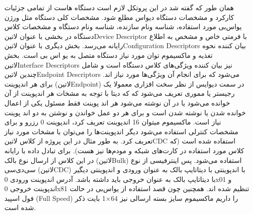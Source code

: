 همان طور که گفته شد در این پروتکل لازم است دستگاه هاست از تمامی جزئیات کارکرد و مشخصات دستگاه دیواس مطلع شود. مشخصات کلی دستگاه مثل ورژن یو‌اس‌بی مورد استفاده، شناسه ونام سازنده، شناسه ونام دستگاه و مشخصات کلاس دستگاه در بخشی با عنوان ‌لاتین{Device Descriptor} با فرمتی خاص و مشخص به اطلاع رایانه می‌رسد. بخش دیگری با عنوان ‌لاتین{Configuration Descriptors} بیان کننده نحوه تغذیه و ماکسیموم توان مورد نیاز دستگاه متصل به یو اس بی است. بخش ‌لاتین{Interface Descriptors} نیز بیان کننده ویژگی‌های کلاس دستگاه است و شامل چندین ‌لاتین{Endpoint Descriptors} می‌شود که برای انجام آن ویژگی‌ها مورد نیاز اند. برای هر اندپوینت (‌لاتین{Endpoint}) در سمت دیوایس از نظر سخت افزاری معمولا یک رجیستر یا مموری تعریف می‌شود که که دیتا با توجه به مشخات هر اندپوینت از آن خوانده می‌شود یا در آن نوشته می‌شود هر اند پوینت فقط مسئول یکی از اعمال خوانده شدن یا نوشته شدن است و برای هر دو عمل خواندن و نوشتن به دو اند پوینت نیاز است. ماکسیموم میتوان 16 اندپوینت تعریف کرد، اندپوینت 0 رزرو و برای مشخصات کنترلی استفاده می‌شود دیگر اندپوینت‌ها را می‌توان با مشخات مورد نیاز تعریف کرد. به طور مثال در این پروژه از کلاس ‌لاتین{CDC} استفاده شده است (که کلاس مورد استفاده در کارت‌های شبکه و مودم‌ها نیز هست). برای تبادل داده با رایانه در این کلاس از ارسال نوع بالک (‌لاتین{Bulk}) استفاده می‌شود. پس اینترفیسی از نوع سی‌دی‌سی (‌لاتین{CDC}) با اندپوینتی با دیتاتایپ بالک به عنوان ورودی و اندپوینتی دیگیر با دیتاتایپ بالک به عنوان خروجی باید داشته باشد. آدرس اندپوینت ورودی 0x01 و اندپوینت خروجی 0x81 تنظیم شده اند. همچنین چون قصد استفاده از یو‌اس‌بی در حالت فول اسپید (Full Speed) را داریم ماکسیموم سایز بسته ارسالی نیز 64$\times$1 بایت ذکر شده است. 









